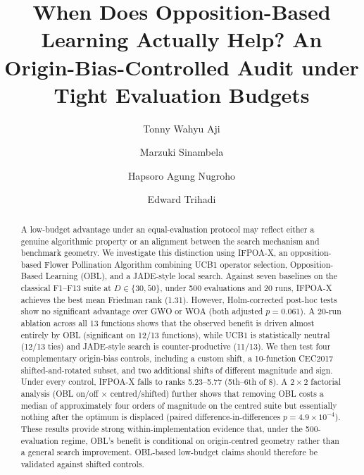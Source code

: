 \documentclass[preprint,12pt]{elsarticle}
\begin{document}
\begin{frontmatter}

\title{When Does Opposition-Based Learning Actually Help? An Origin-Bias-Controlled Audit under Tight Evaluation Budgets}

\author[aff1]{Tonny Wahyu Aji}

\author[aff1]{Marzuki Sinambela}

\author[aff1]{Hapsoro Agung Nugroho}

\author[aff1]{Edward Trihadi}



\begin{abstract}
A low-budget advantage under an equal-evaluation protocol may reflect either a genuine algorithmic property or an alignment between the search mechanism and benchmark geometry. We investigate this distinction using IFPOA-X, an opposition-based Flower Pollination Algorithm combining UCB1 operator selection, Opposition-Based Learning (OBL), and a JADE-style local search. Against seven baselines on the classical F1--F13 suite at $D \in \{30,50\}$, under 500 evaluations and 20 runs, IFPOA-X achieves the best mean Friedman rank (1.31). However, Holm-corrected post-hoc tests show no significant advantage over GWO or WOA (both adjusted $p=0.061$). A 20-run ablation across all 13 functions shows that the observed benefit is driven almost entirely by OBL (significant on 12/13 functions), while UCB1 is statistically neutral (12/13 ties) and JADE-style search is counter-productive (11/13). We then test four complementary origin-bias controls, including a custom shift, a 10-function CEC2017 shifted-and-rotated subset, and two additional shifts of different magnitude and sign. Under every control, IFPOA-X falls to ranks 5.23--5.77 (5th--6th of 8). A $2\times 2$ factorial analysis (OBL on/off $\times$ centred/shifted) further shows that removing OBL costs a median of approximately four orders of magnitude on the centred suite but essentially nothing after the optimum is displaced (paired difference-in-differences $p=4.9\times10^{-4}$). These results provide strong within-implementation evidence that, under the 500-evaluation regime, OBL's benefit is conditional on origin-centred geometry rather than a general search improvement. OBL-based low-budget claims should therefore be validated against shifted controls.
\end{abstract}



\end{frontmatter}
\end{document}
